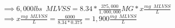 \begin{enumerate}
\vspace{0.3cm}
$\implies 6,000 lbs \enspace MLVSS=8.34 * \frac{375,000}{1,000,000}MG*x\frac{mg \enspace MLVSS}{L}$\\
$\implies x\frac{mg \enspace MLVSS}{L} = \frac{6000}{8.34*0.375}=\boxed{1,900\frac{mg \enspace MLVSS}{L}}$






























\end{enumerate}


